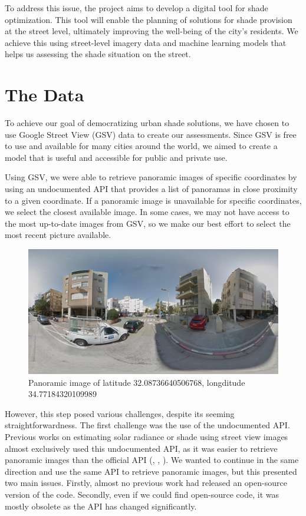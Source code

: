 \documentclass[nohyperref]{article}
\theoremstyle{plain}
\theoremstyle{definition}
\theoremstyle{remark}
\begin{document}
To address this issue, the project aims to develop a digital tool for shade optimization. This tool will enable the planning of solutions for shade provision at the street level, ultimately improving the well-being of the city's residents. We achieve this using street-level imagery data and machine learning models that helps us assessing the shade situation on the street.

\section{The Data}
\label{data}
To achieve our goal of democratizing urban shade solutions, we have chosen to use Google Street View (GSV) data to create our assessments. Since GSV is free to use and available for many cities around the world, we aimed to create a model that is useful and accessible for public and private use.

Using GSV, we were able to retrieve panoramic images of specific coordinates by using an undocumented API that provides a list of panoramas in close proximity to a given coordinate. If a panoramic image is unavailable for specific coordinates, we select the closest available image. In some cases, we may not have access to the most up-to-date images from GSV, so we make our best effort to select the most recent picture available.

\begin{figure}[ht]
\begin{center}
\centerline{\includegraphics[width=\columnwidth]{example_panorama.jpg}}
\caption{Panoramic image of latitude 32.08736640506768, longditude 34.77184320109989}
\vskip -0.2in
\end{center}
\end{figure}

However, this step posed various challenges, despite its seeming straightforwardness. The first challenge was the use of the undocumented API. Previous works on estimating solar radiance or shade using street view images almost exclusively used this undocumented API, as it was easier to retrieve panoramic images than the official API (\citet{rs14020260}, \citet{GONG2019547}, \citet{LI2018109}). We wanted to continue in the same direction and use the same API to retrieve panoramic images, but this presented two main issues. Firstly, almost no previous work had released an open-source version of the code. Secondly, even if we could find open-source code, it was mostly obsolete as the API has changed significantly.
\end{document}
